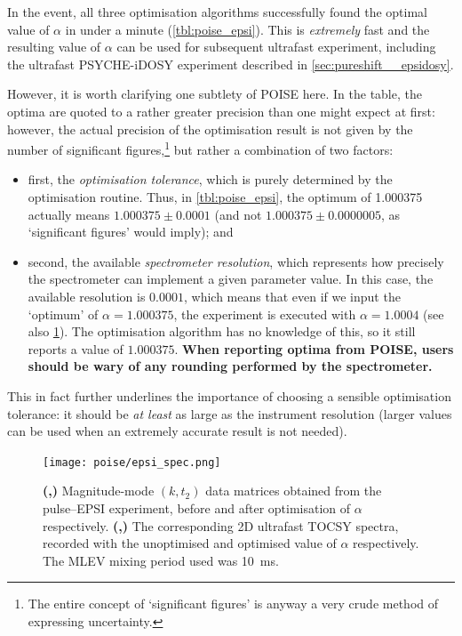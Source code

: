 In the event, all three optimisation algorithms successfully found the optimal value of $\alpha$ in under a minute (\cref{tbl:poise_epsi}).
This is \textit{extremely} fast and the resulting value of $\alpha$ can be used for  subsequent ultrafast experiment, including the ultrafast PSYCHE-iDOSY experiment described in \cref{sec:pureshift__epsidosy}.

However, it is worth clarifying one subtlety of POISE here.
In the table, the optima are quoted to a rather greater precision than one might expect at first: however, the actual precision of the optimisation result is not given by the number of significant figures,\footnote{The entire concept of `significant figures' is anyway a very crude method of expressing uncertainty.} but rather a combination of two factors:

\begin{itemize}
    \item first, the \textit{optimisation tolerance}, which is purely determined by the optimisation routine. Thus, in \cref{tbl:poise_epsi}, the optimum of 1.000375 actually means $1.000375 \pm 0.0001$ (and not $1.000375 \pm 0.0000005$, as `significant figures' would imply); and
    \item second, the available \textit{spectrometer resolution}, which represents how precisely the spectrometer can implement a given parameter value.
        In this case, the available resolution is $0.0001$, which means that even if we input the `optimum' of $\alpha = 1.000375$, the experiment is executed with $\alpha = 1.0004$ (see also \cref{fig:epsi_spec}).
        The optimisation algorithm has no knowledge of this, so it still reports a value of $1.000375$.
        \textbf{When reporting optima from POISE, users should be wary of any rounding performed by the spectrometer.}
\end{itemize}

This in fact further underlines the importance of choosing a sensible optimisation tolerance: it should be \textit{at least} as large as the instrument resolution (larger values can be used when an extremely accurate result is not needed).

\begin{figure}[htb]
    \centering
    \texttt{[image: poise/epsi\_spec.png]}%
    {\label{fig:epsi_spec_kt_noopt}}%
    {\label{fig:epsi_spec_kt_opt}}%
    {\label{fig:epsi_spec_tocsy_noopt}}%
    {\label{fig:epsi_spec_tocsy_opt}}%
    \caption[Comparison between unoptimised and optimised EPSI spectra]{
        \textbf{(,)} Magnitude-mode $(k, t_2)$ data matrices obtained from the pulse--EPSI experiment, before and after optimisation of $\alpha$ respectively.
        \textbf{(,)} The corresponding 2D ultrafast TOCSY spectra, recorded with the unoptimised and optimised value of $\alpha$ respectively.
        The MLEV mixing period used was \qty{10}{\ms}.
    }
    \label{fig:epsi_spec}
\end{figure}

